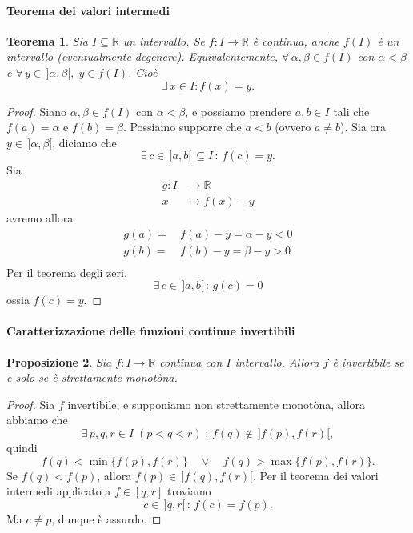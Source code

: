 \documentclass{article}
\theoremstyle{plain}
\newtheorem{thm}{Teorema}[section]
\newtheorem{prop}[thm]{Proposizione}
\theoremstyle{definition}
\theoremstyle{remark}
\begin{document}
\paragraph{Teorema dei valori intermedi}
\begin{bxthm}
\begin{thm}
    Sia $I\subseteq\mathbb{R}$ un intervallo. Se $f:I\to\mathbb{R}$ è continua, anche $f(I)$ è un intervallo (eventualmente degenere).
    Equivalentemente, $\forall\,\alpha,\beta\in f(I)$ con $\alpha<\beta$ e $\forall\,y\in\,]\alpha,\beta[,\;y\in f(I)$.
    Cioè \[\exists\, x\in I: f(x)=y.\]
\end{thm}
\end{bxthm}
\begin{proof}
    Siano $\alpha,\beta\in f(I)$ con $\alpha<\beta$, e possiamo prendere $a,b\in I$ tali che $f(a)=\alpha$ e $f(b)=\beta$.
    Possiamo supporre che $a<b$ (ovvero $a\neq b$).
    Sia ora $y\in\,]\alpha,\beta[$, diciamo che \[\exists\, c\in\,]a,b[\,\subseteq I\,:\,f(c)=y.\]
    Sia 
    \begin{align*}
        g:I&\to\mathbb{R}\\
        x&\mapsto f(x)-y
    \end{align*}
    avremo allora
    \begin{align*}
        g(a)=&\,f(a)-y=\alpha-y<0\\
        g(b)=&\,f(b)-y=\beta-y>0\\
    \end{align*}
    Per il teorema degli zeri, \[\exists\, c\in\, ]a,b[\,:\,g(c)=0\] ossia $f(c)=y$.
\end{proof}

\vspace{10pt}

\paragraph{Caratterizzazione delle funzioni continue invertibili}
\begin{bxthm}
\begin{prop}
    Sia $f:I\to\mathbb{R}$ continua con $I$ intervallo. Allora $f$ è invertibile se e solo se è strettamente monotòna.
\end{prop}
\end{bxthm}
\begin{proof}
    Sia $f$ invertibile, e supponiamo non strettamente monotòna, allora abbiamo che 
    \[\exists\, p,q,r\in I\;(p<q<r)\;:\,f(q)\notin\,]f(p),f(r)[,\]
    quindi
    \[f(q)<\min\{f(p),f(r)\}\quad\lor\quad f(q)>\max\{f(p),f(r)\}.\]
    Se $f(q)<f(p)$, allora $f(p)\in\, ]f(q),f(r)[$.
    Per il teorema dei valori intermedi applicato a $f\in[q,r]$ troviamo \[c\in\,]q,r[\,:\,f(c)=f(p).\]
    Ma $c\neq p$, dunque è assurdo.
\end{proof}
\end{document}

